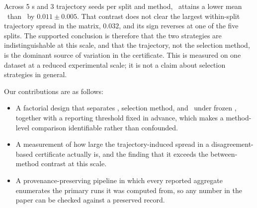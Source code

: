 Across 5 \splitseed{}s and 3 trajectory seeds per split and method, \methodrandom\
attains a lower mean \certbound\ than \methodmax\ by $0.011 \pm 0.005$. That
contrast does not clear the largest within-split trajectory spread in the
matrix, $0.032$, and its sign reverses at one of the five splits. The supported
conclusion is therefore that the two strategies are indistinguishable at this
scale, and that the trajectory, not the selection method, is the dominant
source of variation in the certificate. This is measured on one dataset at a
reduced experimental scale; it is not a claim about selection strategies in
general.

Our contributions are as follows:
\begin{itemize}[itemsep=0.5ex, parsep=0pt, topsep=0pt]
\item[\textbf{(1)}] A factorial design that separates \splitseed, selection
method, and \trajseed\ under frozen \evalsem, together with a reporting
threshold fixed in advance, which makes a method-level comparison identifiable
rather than confounded.

\item[\textbf{(2)}] A measurement of how large the trajectory-induced spread in
a disagreement-based certificate actually is, and the finding that it exceeds
the between-method contrast at this scale.

\item[\textbf{(3)}] A provenance-preserving pipeline in which every reported
aggregate enumerates the primary runs it was computed from, so any number in
the paper can be checked against a preserved record.
\end{itemize}
